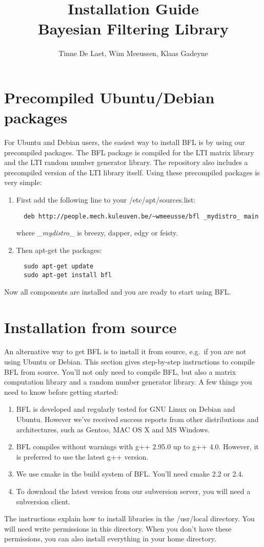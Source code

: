\documentclass[a4paper,10pt]{article}
\title{Installation Guide \\  Bayesian Filtering Library}
\author{Tinne De Laet, Wim Meeussen, Klaas Gadeyne}
\begin{document}
\maketitle



\section{Precompiled Ubuntu/Debian packages}
\label{sec:ubuntu}
For Ubuntu and Debian users, the easiest way to install BFL is by
using our precompiled packages.  The BFL package is compiled for the
LTI matrix library and the LTI random number generator library.  The
repository also includes a precompiled version of the LTI library
itself.  Using these precompiled packages is very simple:
\begin{enumerate}
\item First add the following line to your /etc/apt/sources.list:
\begin{verbatim}
  deb http://people.mech.kuleuven.be/~wmeeusse/bfl _mydistro_ main
\end{verbatim}
  where \emph{\_mydistro\_} is breezy, dapper, edgy or feisty.
\item Then apt-get the packages:
\begin{verbatim}
  sudo apt-get update
  sudo apt-get install bfl
\end{verbatim}
\end{enumerate}
Now all components are installed and you are ready to start using BFL.




\section{Installation from source}
An alternative way to get BFL is to install it from source, e.g.~if
you are not using Ubuntu or Debian. This section gives step-by-step
instructions to compile BFL from source. You'll not only need to
compile BFL, but also a matrix computation library and a random number
generator library. A few things you need to know before getting
started:
\begin{enumerate}
\item BFL is developed and regularly tested for GNU Linux on
  Debian and Ubuntu. However we've received success reports from other
  distributions and architectures, such as Gentoo, MAC OS X and MS
  Windows.
\item BFL compiles without warnings with g++ 2.95.0 up to g++ 4.0.
  However, it is preferred to use the latest g++ version.
\item We use cmake in the build system of BFL. You'll need cmake 2.2
  or 2.4.
\item To download the latest version from our subversion server, you
  will need a subversion client.
\end{enumerate}
The instructions explain how to install libraries in the /usr/local
directory. You will need write permissions in this directory. When you
don't have these permissions, you can also install everything in your
home directory.
\end{document}
